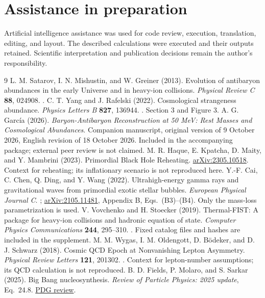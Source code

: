 \documentclass[10pt,a4paper,twocolumn]{article}
\begin{document}
\section*{Assistance in preparation}
Artificial intelligence assistance was used for code review, execution, translation, editing, and layout. The described calculations were executed and their outputs retained. Scientific interpretation and publication decisions remain the author's responsibility.

\begin{thebibliography}{9}\small
{} L. M. Satarov, I. N. Mishustin, and W. Greiner (2013). Evolution of antibaryon abundances in the early Universe and in heavy-ion collisions. \textit{Physical Review C} \textbf{88}, 024908. .
 C. T. Yang and J. Rafelski (2022). Cosmological strangeness abundance. \textit{Physics Letters B} \textbf{827}, 136944. . Section 3 and Figure 3.
 A. G. García (2026). \textit{Baryon-Antibaryon Reconstruction at 50 MeV: Rest Masses and Cosmological Abundances}. Companion manuscript, original version of 9 October 2026, English revision of 18 October 2026. Included in the accompanying package; external peer review is not claimed.
 M. R. Haque, E. Kpatcha, D. Maity, and Y. Mambrini (2023). Primordial Black Hole Reheating. \href{https://arxiv.org/abs/2305.10518}{arXiv:2305.10518}. Context for reheating; its inflationary scenario is not reproduced here.
 Y.-F. Cai, C. Chen, Q. Ding, and Y. Wang (2022). Ultrahigh-energy gamma rays and gravitational waves from primordial exotic stellar bubbles. \textit{European Physical Journal C}. ; \href{https://arxiv.org/abs/2105.11481}{arXiv:2105.11481}, Appendix B, Eqs.~(B3)--(B4). Only the mass-loss parametrization is used.
 V. Vovchenko and H. Stoecker (2019). Thermal-FIST: A package for heavy-ion collisions and hadronic equation of state. \textit{Computer Physics Communications} \textbf{244}, 295--310. . Fixed catalog files and hashes are included in the supplement.
 M. M. Wygas, I. M. Oldengott, D. B\"odeker, and D. J. Schwarz (2018). Cosmic QCD Epoch at Nonvanishing Lepton Asymmetry. \textit{Physical Review Letters} \textbf{121}, 201302. . Context for lepton-number assumptions; its QCD calculation is not reproduced.
 B. D. Fields, P. Molaro, and S. Sarkar (2025). Big Bang nucleosynthesis. \textit{Review of Particle Physics: 2025 update}, Eq.~24.8. \href{https://pdg.lbl.gov/2025/reviews/rpp2025-rev-bbang-nucleosynthesis.pdf}{PDG review}.
\end{thebibliography}
\end{document}
